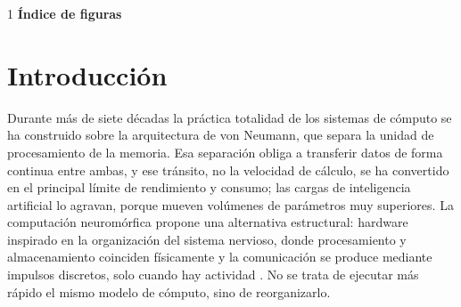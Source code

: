 \documentclass[a4paper,11pt,oneside]{book}
\begin{document}
        \clearpage
        \begin{spacing}{1}
            \small
            \tableofcontents
            \vspace{1.6em}
            {\large\bfseries\color{azul} Índice de figuras}\par\vspace{0.7em}
            \makeatletter{}\makeatother
        \end{spacing}



    \mainmatter
    \pagestyle{mainmatter}

\chapter{Introducción}
\label{cap:introduccion}


Durante más de siete décadas la práctica totalidad de los sistemas de cómputo se
ha construido sobre la arquitectura de von Neumann, que separa la unidad de
procesamiento de la memoria. Esa separación obliga a transferir datos de forma
continua entre ambas, y ese tránsito, no la velocidad de cálculo, se ha
convertido en el principal límite de rendimiento y consumo; las cargas de
inteligencia artificial lo agravan, porque mueven volúmenes de parámetros muy
superiores. La computación neuromórfica propone una alternativa estructural:
hardware inspirado en la organización del sistema nervioso, donde procesamiento
y almacenamiento coinciden físicamente y la comunicación se produce mediante
impulsos discretos, solo cuando hay actividad \parencite{mead1990}. No se trata
de ejecutar más rápido el mismo modelo de cómputo, sino de reorganizarlo.
\end{document}

